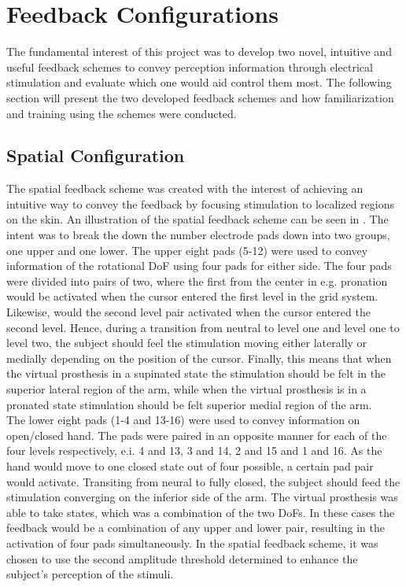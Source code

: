 \section{Feedback Configurations} \label{sec:feed}

The fundamental interest of this project was to develop two novel, intuitive and useful feedback schemes to convey perception information through electrical stimulation and evaluate which one would aid control them most. The following section will present the two developed feedback schemes and how familiarization and training using the schemes were conducted.     

\subsection{Spatial Configuration}

The spatial feedback scheme was created with the interest of achieving an intuitive way to convey the feedback by focusing stimulation to localized regions on the skin. An illustration of the spatial feedback scheme can be seen in . The intent was to break the down the number electrode pads down into two groups, one upper and one lower. The upper eight pads (5-12) were used to convey information of the rotational DoF using four pads for either side.  The four pads were divided into pairs of two, where the first from the center in e.g. pronation would be activated when the cursor entered the first level in the grid system. Likewise, would the second level pair activated when the cursor entered the second level. Hence, during a transition from neutral to level one and level one to level two, the subject should feel the stimulation moving either laterally or medially depending on the position of the cursor. Finally, this means that when the virtual prosthesis in a supinated state the stimulation should be felt in the superior lateral region of the arm, while when the virtual prosthesis is in a pronated state stimulation should be felt superior medial region of the arm.   \\
The lower eight pads (1-4 and 13-16) were used to convey information on open/closed hand. The pads were paired in an opposite manner for each of the four levels respectively, e.i. 4 and 13, 3 and 14, 2 and 15 and 1 and 16. As the hand would move to one closed state out of four possible, a certain pad pair would activate. Transiting from neural to fully closed, the subject should feed the stimulation converging on the inferior side of the arm. The virtual prosthesis was able to take states, which was a combination of the two DoFs. In these cases the feedback would be a combination of any upper and lower pair, resulting in the activation of four pads simultaneously. In the spatial feedback scheme, it was chosen to use the second amplitude threshold determined to enhance the subject's perception of the stimuli. 

